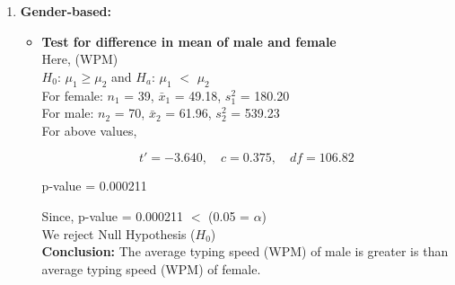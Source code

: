 \documentclass[12pt,a4paper]{report}
\begin{document}
\begin{enumerate}[label=\textbf{\arabic*})]
    \item \textbf{Gender-based:}
    \begin{itemize}
        \item \textbf{Test for difference in mean of male and female} \\
        Here, (WPM) \\
        $H_0$: $\mu_1  \geq \mu_2$ and 
        $H_a$: $\mu_1$ $<$ $\mu_2$ \\
        
        For female: $n_1$ = 39, $\bar{x}_1$ = 49.18, $s^2_1$ = 180.20 \\
        For male: $n_2$ = 70, $\bar{x}_2$ = 61.96, $s^2_2$ = 539.23 \\
        For above values,
        
    \[
    t' = -3.640, \quad c = 0.375, \quad df = 106.82 \]
    
    \begin{center}
        p-value = 0.000211				
    \end{center}
    Since, p-value = 0.000211 $<$ (0.05 = $\alpha$) \\
    We reject Null Hypothesis ($H_0$) \\
    \textbf{Conclusion: } 
    The average typing speed (WPM) of male is greater is than average typing speed (WPM) of female. \\
    
    \end{itemize}
    

\end{enumerate}
\end{document}
